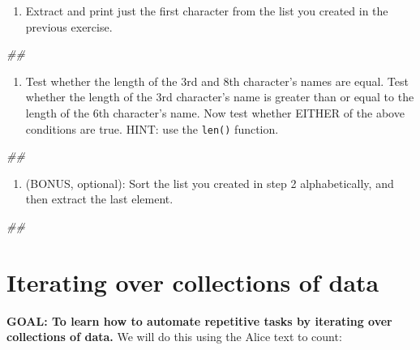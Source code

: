 \documentclass[
]{book}
\newenvironment{Shaded}{\begin{snugshade}}{\end{snugshade}}
\newcommand{\CommentTok}[1]{\textcolor[rgb]{0.56,0.35,0.01}{\textit{#1}}}
\providecommand{\tightlist}{%
  \setlength{\itemsep}{0pt}\setlength{\parskip}{0pt}}
\begin{document}
\begin{enumerate}
\def\labelenumi{\arabic{enumi}.}
\setcounter{enumi}{1}
\tightlist
\item
  Extract and print just the first character from the list you created in the previous exercise.
\end{enumerate}

\begin{Shaded}
\begin{Highlighting}[]
\CommentTok{##}
\end{Highlighting}
\end{Shaded}

\begin{enumerate}
\def\labelenumi{\arabic{enumi}.}
\setcounter{enumi}{2}
\tightlist
\item
  Test whether the length of the 3rd and 8th character's names are equal. Test whether the length of
  the 3rd character's name is greater than or equal to the length of the 6th character's name. Now test
  whether EITHER of the above conditions are true. HINT: use the \texttt{len()} function.
\end{enumerate}

\begin{Shaded}
\begin{Highlighting}[]
\CommentTok{##}
\end{Highlighting}
\end{Shaded}

\begin{enumerate}
\def\labelenumi{\arabic{enumi}.}
\setcounter{enumi}{3}
\tightlist
\item
  (BONUS, optional): Sort the list you created in step 2 alphabetically,
  and then extract the last element.
\end{enumerate}

\begin{Shaded}
\begin{Highlighting}[]
\CommentTok{##}
\end{Highlighting}
\end{Shaded}

\hypertarget{iterating-over-collections-of-data}{%
\section{Iterating over collections of data}\label{iterating-over-collections-of-data}}

\textbf{GOAL: To learn how to automate repetitive tasks by iterating over collections of data.} We will do this using the Alice text to count:
\end{document}
